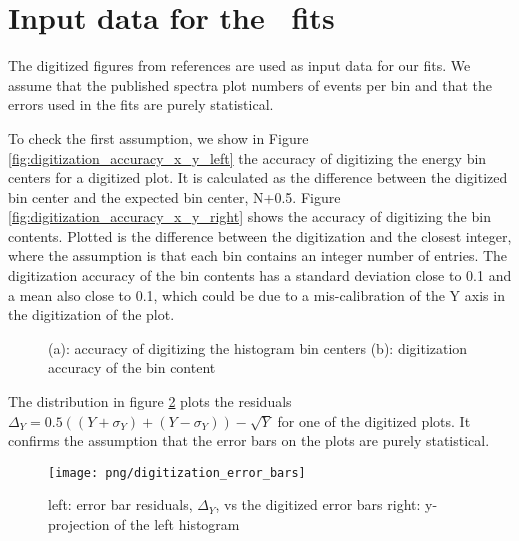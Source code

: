 \section { Input data for the \kmax\ fits}

The digitized figures from references \cite{RMC_1992_PhysRevC.46.1094,RMC_1999_PhysRevC.59.2853}
are used as input data for our fits. We assume that the published spectra plot numbers of events
per bin and that the errors used in the fits are purely statistical.

To check the first assumption, we show in Figure \ref{fig:digitization_accuracy_x_y_left} the accuracy
of digitizing the energy bin centers for a digitized plot. It is calculated as the difference between 
the digitized bin center and the expected bin center, N+0.5.
Figure \ref{fig:digitization_accuracy_x_y_right} shows the accuracy of digitizing the bin contents.
Plotted is the difference between the digitization and the closest integer, where the assumption is that 
each bin contains an integer number of entries. The digitization accuracy of the bin contents has
a standard deviation close to 0.1 and a mean also close to 0.1, which could be due to a
mis-calibration of the Y axis in the digitization of the plot.

\begin{figure}[htbp]
  \begin{center}
  \end{center}
  \caption{
    (a): accuracy of digitizing the histogram bin centers
    (b): digitization accuracy of the bin content
  }
  \label{fig:digitization_accuracy_x_y}
\end{figure}

The distribution in figure \ref{fig:digitization_accuracy_error_bars} plots the residuals
$\Delta_Y = 0.5((Y+\sigma_Y) + (Y-\sigma_Y)) - \sqrt{Y}$ for one of the digitized plots.
It confirms the assumption that the error bars on the plots are purely statistical.

\begin{figure}[htbp]
  \begin{center}
    \texttt{[image: png/digitization\_error\_bars]} 
  \end{center}
  \caption{
    left: error bar residuals, $\Delta_Y$, vs the digitized error bars
    right: y-projection of the left histogram
  }
  \label{fig:digitization_accuracy_error_bars}
\end{figure}


